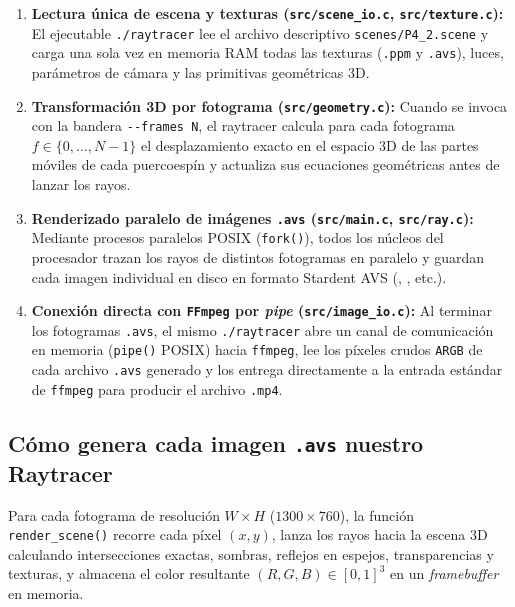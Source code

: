\documentclass[11pt,letterpaper]{article}
\begin{document}
\begin{enumerate}[leftmargin=1.5em]
    \item \textbf{Lectura única de escena y texturas (\texttt{src/scene\_io.c}, \texttt{src/texture.c}):}
    El ejecutable \texttt{./raytracer} lee el archivo descriptivo \texttt{scenes/P4\_2.scene} y carga una sola vez en memoria RAM todas las texturas (\texttt{.ppm} y \texttt{.avs}), luces, parámetros de cámara y las primitivas geométricas 3D.

    \item \textbf{Transformación 3D por fotograma (\texttt{src/geometry.c}):}
    Cuando se invoca con la bandera \texttt{-{}-frames N}, el raytracer calcula para cada fotograma $f \in \{0, \dots, N-1\}$ el desplazamiento exacto en el espacio 3D de las partes móviles de cada puercoespín y actualiza sus ecuaciones geométricas antes de lanzar los rayos.

    \item \textbf{Renderizado paralelo de imágenes \texttt{.avs} (\texttt{src/main.c}, \texttt{src/ray.c}):}
    Mediante procesos paralelos POSIX (\texttt{fork()}), todos los núcleos del procesador trazan los rayos de distintos fotogramas en paralelo y guardan cada imagen individual en disco en formato Stardent AVS (, , etc.).

    \item \textbf{Conexión directa con \texttt{FFmpeg} por \textit{pipe} (\texttt{src/image\_io.c}):}
    Al terminar los fotogramas \texttt{.avs}, el mismo \texttt{./raytracer} abre un canal de comunicación en memoria (\texttt{pipe()} POSIX) hacia \texttt{ffmpeg}, lee los píxeles crudos \texttt{ARGB} de cada archivo \texttt{.avs} generado y los entrega directamente a la entrada estándar de \texttt{ffmpeg} para producir el archivo \texttt{.mp4}.
\end{enumerate}

\subsection{Cómo genera cada imagen \texttt{.avs} nuestro Raytracer}

Para cada fotograma de resolución $W \times H$ ($1300 \times 760$), la función \texttt{render\_scene()} recorre cada píxel $(x, y)$, lanza los rayos hacia la escena 3D calculando intersecciones exactas, sombras, reflejos en espejos, transparencias y texturas, y almacena el color resultante $(R, G, B) \in [0, 1]^3$ en un \textit{framebuffer} en memoria.
\end{document}

